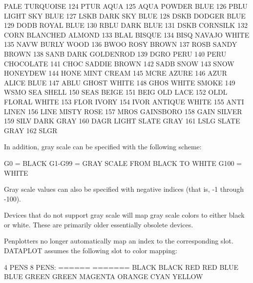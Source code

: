         PALE TURQUOISE    124       PTUR
        AQUA              125       AQUA
        POWDER BLUE       126       PBLU
        LIGHT SKY BLUE    127       LSKB
        DARK SKY BLUE     128       DSKB
        DODGER BLUE       129       DODB
        ROYAL BLUE        130       RBLU
        DARK BLUE         131       DSKB
        CORNSILK          132       CORN
        BLANCHED ALMOND   133       BLAL
        BISQUE            134       BISQ
        NAVAJO WHITE      135       NAVW
        BURLY WOOD        136       BWOO
        ROSY BROWN        137       ROSB
        SANDY BROWN       138       SANB
        DARK GOLDENROD    139       DGRO
        PERU              140       PERU
        CHOCOLATE         141       CHOC
        SADDIE BROWN      142       SADB
        SNOW              143       SNOW
        HONEYDEW          144       HONE
        MINT CREAM        145       MCRE
        AZURE             146       AZUR
        ALICE BLUE        147       ABLU
        GHOST WHITE       148       GHOS
        WHITE SMOKE       149       WSMO
        SEA SHELL         150       SEAS
        BEIGE             151       BEIG
        OLD LACE          152       OLDL
        FLORAL WHITE      153       FLOR
        IVORY             154       IVOR
        ANTIQUE WHITE     155       ANTI
        LINEN             156       LINE
        MISTY ROSE        157       MROS
        GAINSBORO         158       GAIN
        SILVER            159       SILV
        DARK GRAY         160       DAGR
        LIGHT SLATE GRAY  161       LSLG
        SLATE GRAY        162       SLGR
 
 
In addition, gray scale can be specified with the following scheme:
 
        G0     = BLACK
        G1-G99 = GRAY SCALE FROM BLACK TO WHITE
        G100   = WHITE
 
Gray scale values can also be specified with negative indices (that is,
-1 through -100).
 
Devices that do not support gray scale will map gray scale colors
to either black or white.  These are primarily older essentially
obsolete devices.

Penplotters no longer automatically map an index to the corresponding
slot.  DATAPLOT assumes the following slot to color mapping:
 
        4 PENS            8 PENS:
        ======            =======
        BLACK             BLACK
        RED               RED
        BLUE              BLUE
        GREEN             GREEN
                          MAGENTA
                          ORANGE
                          CYAN
                          YELLOW
 
